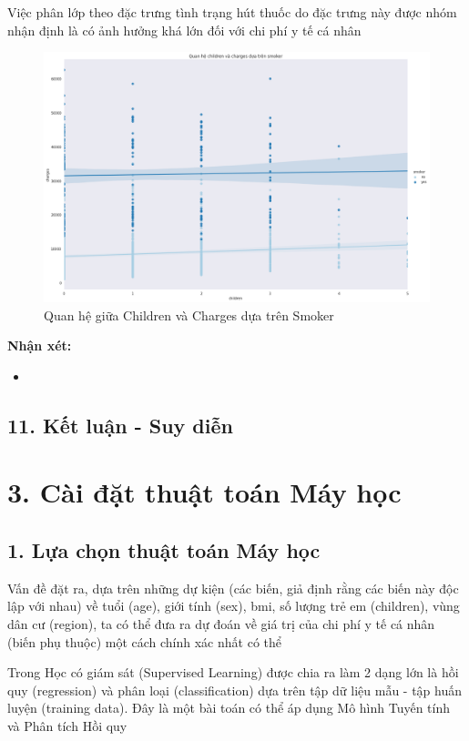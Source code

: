 \documentclass{article}
\begin{document}
	Việc phân lớp theo đặc trưng tình trạng hút thuốc do đặc trưng này được nhóm nhận định là có ảnh hưởng khá lớn đối với chi phí y tế cá nhân
	\begin{figure}[H]
		\centering
		\includegraphics[width=1\textwidth]{images/children_charges_by_smoker.png}
		\caption{Quan hệ giữa Children và Charges dựa trên Smoker}
		\label{fig:writing-thesis-linear-model-medical-charges-children-group-smoker}
	\end{figure}
	\textbf{Nhận xét:} 
	\begin{itemize}
		\item
	\end{itemize}

	\subsection{11. Kết luận - Suy diễn}
	
	\section{3. Cài đặt thuật toán Máy học}
	
	\subsection{1. Lựa chọn thuật toán Máy học}
	\qquad Vấn đề đặt ra, dựa trên những dự kiện (các biến, giả định rằng các biến này độc lập với nhau) về tuổi (age), giới tính (sex), bmi, số lượng trẻ em (children), vùng dân cư (region), ta có thể đưa ra dự đoán về giá trị của chi phí y tế cá nhân (biến phụ thuộc) một cách chính xác nhất có thể
	
	Trong Học có giám sát (Supervised Learning) được chia ra làm 2 dạng lớn là hồi quy (regression) và phân loại (classification) dựa trên tập dữ liệu mẫu - tập huấn luyện (training data). Đây là một bài toán có thể áp dụng Mô hình Tuyến tính và Phân tích Hồi quy
	
\end{document}
